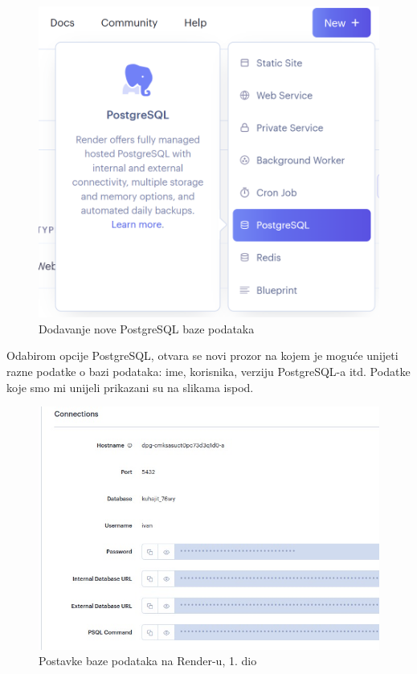 				\begin{figure}[H]
			\includegraphics[scale=0.4]{slike/Render_PostgreSQL.PNG} %
			\centering
			\caption{Dodavanje nove PostgreSQL baze podataka}
			\label{Dodavanje nove PostgreSQL baze podataka}
		\end{figure}
		
		Odabirom opcije PostgreSQL, otvara se novi prozor na kojem je moguće unijeti razne podatke o bazi podataka: ime, korisnika, verziju PostgreSQL-a itd. Podatke koje smo mi unijeli prikazani su na slikama ispod.
		
			\begin{figure}[H]
			\includegraphics[scale=0.4]{slike/Render_DATABASE_1.JPG} %
			\centering
			\caption{Postavke baze podataka na Render-u, 1. dio}
			\label{Postavke baze podataka na Render-u, 1. dio}
		\end{figure}
		
